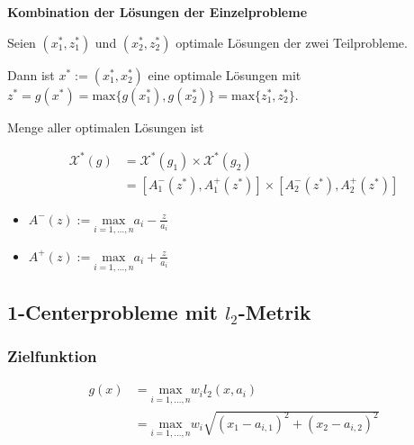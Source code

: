           \par \textbf{Kombination der Lösungen der Einzelprobleme}

          \par Seien $(x_1^*, z_1^*)$ und $(x_2^*, z_2^*)$ optimale Lösungen der zwei Teilprobleme.

          \par Dann ist $x^* := (x_1^*, x_2^*)$ eine optimale Lösungen mit $z^* = g(x^*) = \text{max}{\{g(x_1^*), g(x_2^*)\}} = \text{max}{\{z_1^*, z_2^*\}}$.

          \par Menge aller optimalen Lösungen ist

          \begin{equation*}
            \begin{aligned}
              \mathcal{X}^*(g) &= \mathcal{X}^*(g_1) \times \mathcal{X}^*(g_2) \\
                               &= [A_1^-(z^*), A_1^+(z^*)] \times [A_2^-(z^*), A_2^+(z^*)]
            \end{aligned}
          \end{equation*}
          \begin{itemize}
            \item $A^-(z) := \underset{i = 1,\dots, n}{\text{max}}a_i - \frac{z}{a_i}$
            \item $A^+(z) := \underset{i = 1,\dots, n}{\text{max}}a_i + \frac{z}{a_i}$
          \end{itemize}
    

    \subsection{1-Centerprobleme mit $l_2$-Metrik} %
    \label{sub:1_centerprobleme_mit_l_2_metrik}

      \subsubsection{Zielfunktion} %
      \label{ssub:zielfunktion}
        \begin{equation}
          \begin{aligned}
            g(x) &= \underset{i = 1,\dots, n}{\text{max}}w_il_2(x,a_i) \\
                 &= \underset{i = 1,\dots, n}{\text{max}}w_i\sqrt{(x_1 - a_{i, 1})^2 + (x_2 - a_{i,2})^2}
          \end{aligned}
        \end{equation}


